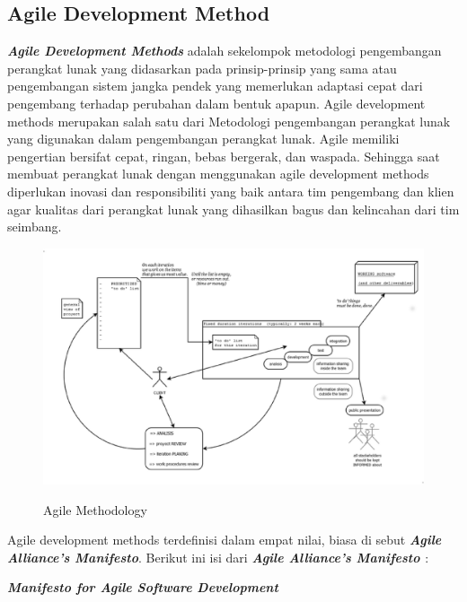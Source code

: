 \documentclass[9pt,twocolumn,twoside]{Gunadarma}
\begin{document}
\subsection{Agile Development Method}
\textbf{\textit{Agile Development Methods}} adalah sekelompok metodologi pengembangan perangkat lunak yang didasarkan pada prinsip-prinsip yang sama atau pengembangan sistem jangka pendek yang memerlukan adaptasi cepat dari pengembang terhadap perubahan dalam bentuk apapun. Agile development methods merupakan salah satu dari Metodologi pengembangan perangkat lunak yang digunakan dalam pengembangan perangkat lunak. Agile memiliki pengertian bersifat cepat, ringan, bebas bergerak, dan waspada. Sehingga saat membuat perangkat lunak dengan menggunakan agile development methods diperlukan inovasi dan responsibiliti yang baik antara tim pengembang dan klien agar kualitas dari perangkat lunak yang dihasilkan bagus dan kelincahan dari tim seimbang.

\begin{figure}[htbp]
\begin{center}
\includegraphics[width=1\columnwidth]{agile_methodology_for_software_development.eps} \label{fig:1-noFCase1}
\end{center}
\caption{Agile Methodology}
\end{figure}

Agile development methods terdefinisi dalam empat nilai, biasa di sebut \textbf{\textit{Agile Alliance’s Manifesto}}. Berikut ini isi dari \textbf{\textit{Agile Alliance’s Manifesto \cite{Agile:01}}} : 

\begin{center}
{\Large \textbf{\textit{Manifesto for Agile Software Development}}}
\end{center}
\end{document}
